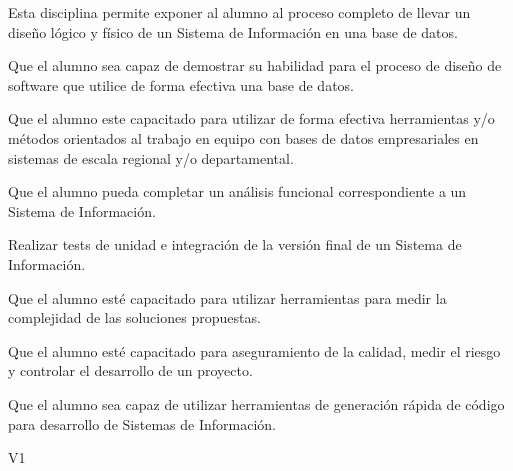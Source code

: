\begin{syllabus}


\begin{justification}
	Esta disciplina permite exponer al alumno al proceso completo de llevar un diseño lógico y físico de un Sistema de Información en una base de datos.
	\end{justification}
	
	\begin{goals}
	\item Que el alumno sea capaz de demostrar su habilidad para el proceso de diseño de software que utilice de forma efectiva una base de datos.
	\item Que el alumno este capacitado para utilizar de forma efectiva herramientas y/o métodos orientados al trabajo en equipo con bases de datos empresariales en sistemas de escala regional y/o departamental.
	\item Que el alumno pueda completar un análisis funcional correspondiente a un Sistema de Información.
	\item Realizar tests de unidad e integración de la versión final de un Sistema de Información.
	\item Que el alumno esté capacitado para utilizar herramientas  para medir la complejidad de las soluciones propuestas.
	\item Que el alumno esté capacitado para aseguramiento de la calidad, medir el riesgo y controlar el desarrollo de un proyecto.
	\item Que el alumno sea capaz de utilizar herramientas de generación rápida de código para desarrollo de Sistemas de Información.
	\end{goals}
	
	\begin{outcomes}{V1}
		\item {}
		\item {}
		\item {}
		\item {}
		\item {}
		\item {}
		\item {}
		\item {}
	\end{outcomes}
	

\end{syllabus}
